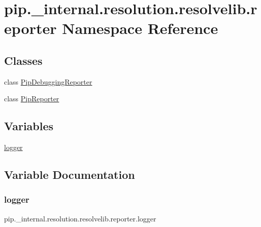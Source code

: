 \hypertarget{namespacepip_1_1__internal_1_1resolution_1_1resolvelib_1_1reporter}{}\section{pip.\+\_\+internal.\+resolution.\+resolvelib.\+reporter Namespace Reference}
\label{namespacepip_1_1__internal_1_1resolution_1_1resolvelib_1_1reporter}
\subsection*{Classes}
\begin{DoxyCompactItemize}
\item 
class \hyperlink{classpip_1_1__internal_1_1resolution_1_1resolvelib_1_1reporter_1_1PipDebuggingReporter}{Pip\+Debugging\+Reporter}
\item 
class \hyperlink{classpip_1_1__internal_1_1resolution_1_1resolvelib_1_1reporter_1_1PipReporter}{Pip\+Reporter}
\end{DoxyCompactItemize}
\subsection*{Variables}
\begin{DoxyCompactItemize}
\item 
\hyperlink{namespacepip_1_1__internal_1_1resolution_1_1resolvelib_1_1reporter_a501ec403992b4beeaa76921196a68a35}{logger}
\end{DoxyCompactItemize}


\subsection{Variable Documentation}
\mbox{\label{namespacepip_1_1__internal_1_1resolution_1_1resolvelib_1_1reporter_a501ec403992b4beeaa76921196a68a35}} 
\subsubsection{\texorpdfstring{logger}{logger}}
{\footnotesize\ttfamily pip.\+\_\+internal.\+resolution.\+resolvelib.\+reporter.\+logger}

